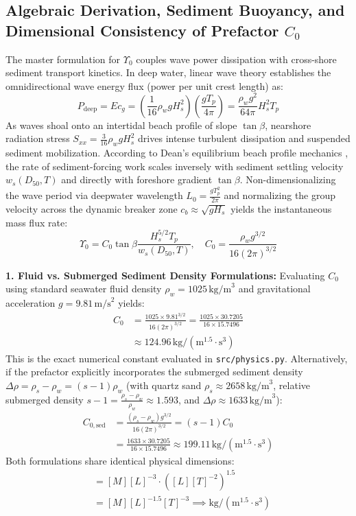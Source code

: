 \documentclass[journal]{IEEEtran}
\begin{document}
\subsection{Algebraic Derivation, Sediment Buoyancy, and Dimensional Consistency of Prefactor \texorpdfstring{$C_0$}{C0}}
The master formulation for $\Upsilon_0$ couples wave power dissipation with cross-shore sediment transport kinetics. In deep water, linear wave theory establishes the omnidirectional wave energy flux (power per unit crest length) as:
\begin{equation}
P_{\text{deep}} = E c_g = \left(\frac{1}{16}\rho_w g H_s^2\right) \left(\frac{g T_p}{4\pi}\right) = \frac{\rho_w g^2}{64\pi} H_s^2 T_p
\end{equation}
As waves shoal onto an intertidal beach profile of slope $\tan\beta$, nearshore radiation stress $S_{xx} = \frac{3}{16}\rho_w g H_s^2$ drives intense turbulent dissipation and suspended sediment mobilization. According to Dean's equilibrium beach profile mechanics \cite{dean1973heuristic}, the rate of sediment-forcing work scales inversely with sediment settling velocity $w_s(D_{50}, T)$ and directly with foreshore gradient $\tan\beta$. Non-dimensionalizing the wave period via deepwater wavelength $L_0 = \frac{g T_p^2}{2\pi}$ and normalizing the group velocity across the dynamic breaker zone $c_b \approx \sqrt{g H_s}$ yields the instantaneous mass flux rate:
\begin{equation}
\Upsilon_0 = C_0 \tan\beta \frac{H_s^{5/2} T_p}{w_s(D_{50}, T)}, \quad C_0 = \frac{\rho_w g^{3/2}}{16(2\pi)^{3/2}}
\end{equation}

\noindent\textbf{1. Fluid vs. Submerged Sediment Density Formulations:}
Evaluating $C_0$ using standard seawater fluid density $\rho_w = 1025\,\text{kg/m}^3$ and gravitational acceleration $g = 9.81\,\text{m/s}^2$ yields:
\begin{align}
C_0 &= \frac{1025 \times 9.81^{3/2}}{16 (2\pi)^{3/2}} = \frac{1025 \times 30.7205}{16 \times 15.7496} \nonumber \\
    &\approx 124.96\,\text{kg}/(\text{m}^{1.5}\cdot\text{s}^3)
\end{align}
This is the exact numerical constant evaluated in \texttt{src/physics.py}. Alternatively, if the prefactor explicitly incorporates the submerged sediment density $\Delta\rho = \rho_s - \rho_w = (s - 1)\rho_w$ (with quartz sand $\rho_s \approx 2658\,\text{kg/m}^3$, relative submerged density $s - 1 = \frac{\rho_s - \rho_w}{\rho_w} \approx 1.593$, and $\Delta\rho \approx 1633\,\text{kg/m}^3$):
\begin{align}
C_{0,\text{sed}} &= \frac{(\rho_s - \rho_w) g^{3/2}}{16(2\pi)^{3/2}} = (s - 1) C_0 \nonumber \\
                 &= \frac{1633 \times 30.7205}{16 \times 15.7496} \approx 199.11\,\text{kg}/(\text{m}^{1.5}\cdot\text{s}^3)
\end{align}
Both formulations share identical physical dimensions:
\begin{align}
[C_0] &= [M][L]^{-3} \cdot ([L][T]^{-2})^{1.5} \nonumber \\
      &= [M][L]^{-1.5}[T]^{-3} \implies \text{kg}/(\text{m}^{1.5}\cdot\text{s}^3)
\end{align}
\end{document}
